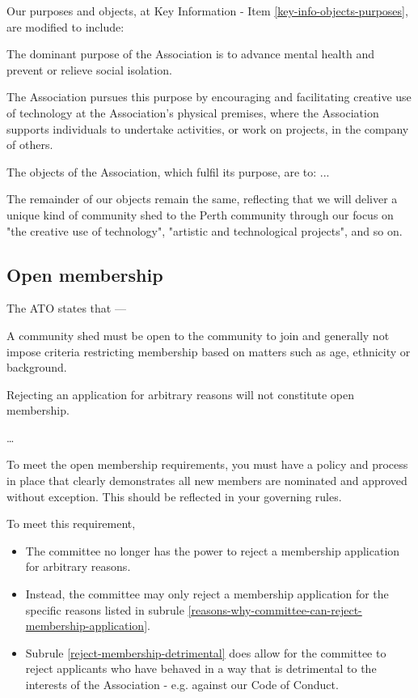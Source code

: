 \documentclass[../constitution.tex]{subfiles}
\begin{document}
Our purposes and objects, at Key Information - Item \ref{key-info-objects-purposes}, are modified to include:

\begin{displayquote}
The dominant purpose of the Association is to advance mental health and prevent or relieve social isolation.

The Association pursues this purpose by encouraging and facilitating creative use of technology at the Association's physical premises, where the Association supports individuals to undertake activities, or work on projects, in the company of others.
  
The objects of the Association, which fulfil its purpose, are to: ...
\end{displayquote}

The remainder of our objects remain the same, reflecting that we will deliver a unique kind of community shed to the Perth community through our focus on "the creative use of technology", "artistic and technological projects", and so on.

\subsection*{Open membership}

The ATO states that ---

\begin{displayquote}

    A community shed must be open to the community to join and generally not impose criteria restricting membership based on matters such as age, ethnicity or background.

    Rejecting an application for arbitrary reasons will not constitute open membership.

    \dots

    To meet the open membership requirements, you must have a policy and process in place that clearly demonstrates all new members are nominated and approved without exception. This should be reflected in your governing rules.

\end{displayquote}

\bigskip

To meet this requirement,

\begin{itemize}
    \item The committee no longer has the power to reject a membership application for arbitrary reasons.
    \item Instead, the committee may only reject a membership application for the specific reasons listed in subrule \ref{reasons-why-committee-can-reject-membership-application}.
    \item Subrule \ref{reject-membership-detrimental} does allow for the committee to reject applicants who have behaved in a way that is detrimental to the interests of the Association - e.g. against our Code of Conduct.
\end{itemize}
\end{document}
